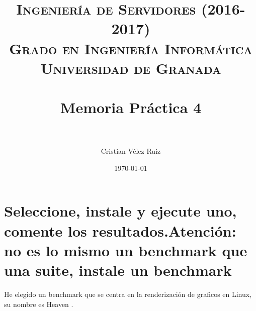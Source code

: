


\title{	
\normalfont \normalsize 
\textsc{\textbf{Ingeniería de Servidores (2016-2017)} \\ Grado en Ingeniería Informática \\ Universidad de Granada} \\ [25pt] %
\horrule{0.5pt} \\[0.4cm] %
\huge Memoria Práctica 4 \\ %
\horrule{2pt} \\[0.5cm] %
}

\author{Cristian Vélez Ruiz} %

\date{\normalsize\today} %



\maketitle %

\newpage %

\tableofcontents %

\listoffigures

\listoftables

\newpage

\section[Cuestión 1]{Seleccione, instale y ejecute uno, comente los resultados.Atención: no es lo mismo un benchmark que una suite, instale un benchmark}

He elegido un benchmark que se centra en la renderización de graficos en Linux, su nombre es Heaven \cite{heaven}.

